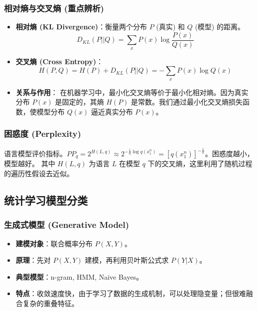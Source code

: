 \documentclass[a4paper, 11pt]{ctexart}
\begin{document}
\subsubsection{相对熵与交叉熵 (重点辨析)}
\begin{itemize}
    \item \textbf{相对熵 (KL Divergence)}：衡量两个分布 $P$ (真实) 和 $Q$ (模型) 的距离。
    $$ D_{KL}(P || Q) = \sum_{x} P(x) \log \frac{P(x)}{Q(x)} $$
    \item \textbf{交叉熵 (Cross Entropy)}：
    $$ H(P, Q) = H(P) + D_{KL}(P||Q) = - \sum_{x} P(x) \log Q(x) $$
    \item \textbf{关系与作用}：
    在机器学习中，最小化交叉熵等价于最小化相对熵。因为真实分布 $P(x)$ 是固定的，其熵 $H(P)$ 是常数。我们通过最小化交叉熵损失函数，使模型分布 $Q(x)$ 逼近真实分布 $P(x)$。
\end{itemize}

\subsubsection{困惑度 (Perplexity)}
语言模型评价指标。$P P_q=2^{H(L, q)} \approx 2^{-\frac{1}{n} \log q\left(x_1^n\right)}=\left[q\left(x_1^n\right)\right]^{-\frac{1}{n}}$。困惑度越小，模型越好。
其中 $H(L, q)$ 为语言 $L$ 在模型 $q$ 下的交叉熵，这里利用了随机过程的遍历性假设去近似。
\subsection{统计学习模型分类}

\subsubsection{生成式模型 (Generative Model)}
\begin{itemize}
    \item \textbf{建模对象}：联合概率分布 $P(X, Y)$。
    \item \textbf{原理}：先对 $P(X, Y)$ 建模，再利用贝叶斯公式求 $P(Y|X)$。
    \item \textbf{典型模型}：n-gram, HMM, Naive Bayes。
    \item \textbf{特点}：收敛速度快，由于学习了数据的生成机制，可以处理隐变量；但很难融合复杂的重叠特征。
\end{itemize}
\end{document}
